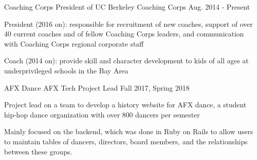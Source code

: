 \begin{cventries}
  \cventry
    {Coaching Corps} %
    {President of UC Berkeley Coaching Corps} %
    {Aug. 2014 - Present} %
    {} %
    {
      \begin{cvitems} %
        \item {President (2016 on): responsible for recruitment of new coaches, support of over 40 current coaches and of fellow Coaching Corps leaders, and communication with Coaching Corps regional corporate staff}
        \item {Coach (2014 on): provide skill and character development to kids of all ages at underprivileged schools in the Bay Area}
      \end{cvitems}
    }
   \cventry
    {AFX Dance} %
    {AFX Tech Project Lead} %
    {Fall 2017, Spring 2018} %
    {} %
    {
      \begin{cvitems} %
        \item {Project lead on a team to develop a history website for AFX dance, a student hip-hop dance organization with over 800 dancers per semester}
        \item {Mainly focused on the backend, which was done in Ruby on Rails to allow users to maintain tables of dancers, directors, board members, and the relationships between these groups.}
      \end{cvitems}
     }

    

\end{cventries}

